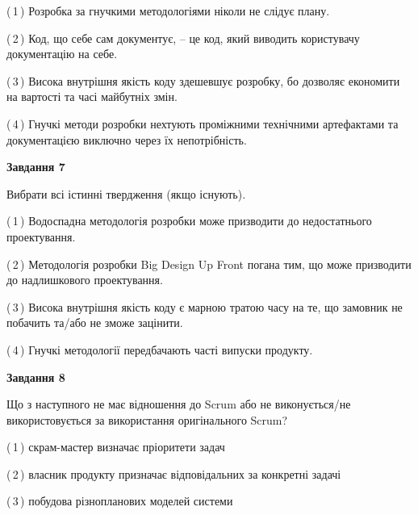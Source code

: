 \documentclass[10pt, ukrainian]{article}
\begin{document}
{\begin {large}
(\,1\,) Розробка за гнучкими методологіями ніколи не слідує плану. %



(\,2\,) Код, що себе сам документує, -- це код, який виводить користувачу документацію на себе. %



(\,3\,) Висока внутрішня якість коду здешевшує розробку, бо дозволяє економити на вартості та часі майбутніх змін. %



(\,4\,) Гнучкі методи розробки нехтують проміжними технічними артефактами та документацією виключно через їх непотрібність. %


{\begin {center}\textbf{Завдання 7}\end {center}}\par
Вибрати всі істинні твердження (якщо існують).\par
\vspace{2mm}



(\,1\,) Водоспадна методологія розробки може призводити до недостатнього проектування. %



(\,2\,) Методологія розробки Big Design Up Front погана тим, що може призводити до надлишкового проектування. %



(\,3\,) Висока внутрішня якість коду є марною тратою часу на те, що замовник не побачить та/або не зможе зацінити. %



(\,4\,) Гнучкі методології передбачають часті випуски продукту. %


{\begin {center}\textbf{Завдання 8}\end {center}}\par
Що з наступного не має відношення до Scrum або не виконується/не використовується за використання оригінального Scrum?\par
\vspace{2mm}



(\,1\,) скрам-мастер визначає пріоритети задач%



(\,2\,) власник продукту призначає відповідальних за конкретні задачі%



(\,3\,) побудова різнопланових моделей системи%




\end{large}}
\end{document}
